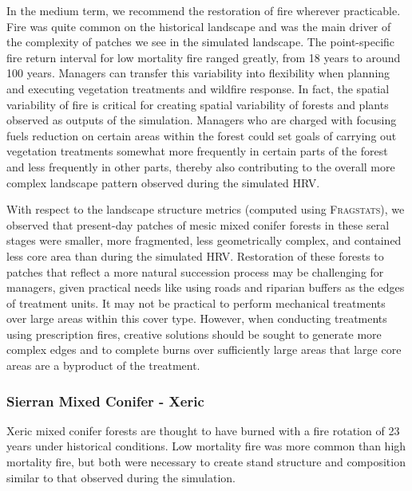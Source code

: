 In the medium term, we recommend the restoration of fire wherever practicable. Fire was quite common on the historical landscape and was the main driver of the complexity of patches we see in the simulated landscape. The point-specific fire return interval for low mortality fire ranged greatly, from 18 years to around 100 years. Managers can transfer this variability into flexibility when planning and executing vegetation treatments and wildfire response. In fact, the spatial variability of fire is critical for creating spatial variability of forests and plants observed as outputs of the simulation. Managers who are charged with focusing fuels reduction on certain areas within the forest could set goals of carrying out vegetation treatments somewhat more frequently in certain parts of the forest and less frequently in other parts, thereby also contributing to the overall more complex landscape pattern observed during the simulated HRV. 

With respect to the landscape structure metrics (computed using \textsc{Fragstats}), we observed that present-day patches of mesic mixed conifer forests in these seral stages were smaller, more fragmented, less geometrically complex, and contained less core area than during the simulated HRV. Restoration of these forests to patches that reflect a more natural succession process may be challenging for managers, given practical needs like using roads and riparian buffers as the edges of treatment units. It may not be practical to perform mechanical treatments over large areas within this cover type. However, when conducting treatments using prescription fires, creative solutions should be sought to generate more complex edges and to complete burns over sufficiently large areas that large core areas are a byproduct of the treatment.
       
\subsubsection{Sierran Mixed Conifer - Xeric}
Xeric mixed conifer forests are thought to have burned with a fire rotation of 23 years under historical conditions. Low mortality fire was more common than high mortality fire, but both were necessary to create stand structure and composition similar to that observed during the simulation. 

